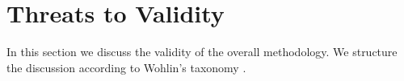 \documentclass[10pt,journal,letterpaper,compsoc]{IEEEtran}
\begin{document}
\section{Threats to Validity} \label{valt} 

In this section we discuss the validity of the overall methodology. 
We structure the discussion according to Wohlin's taxonomy \cite{Wohlin2000}.


\end{document}
